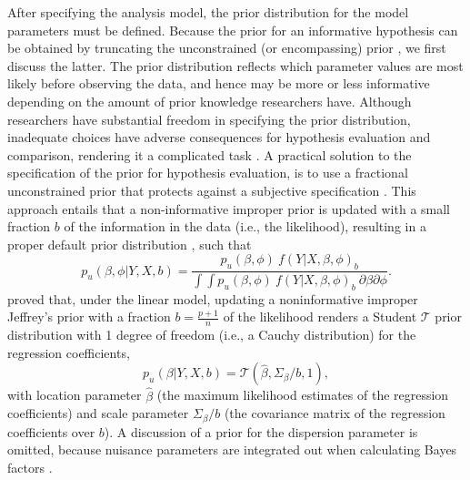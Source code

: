 \documentclass[review, 3p, authoryear]{elsarticle} %
\begin{document}
After specifying the analysis model, the prior distribution for the model parameters must be defined.
Because the prior for an informative hypothesis can be obtained by truncating the unconstrained (or encompassing) prior \citep[e.g.,][]{klugkist_inequality_2005}, we first discuss the latter.
The prior distribution reflects which parameter values are most likely before observing the data, and hence may be more or less informative depending on the amount of prior knowledge researchers have.
Although researchers have substantial freedom in specifying the prior distribution, inadequate choices have adverse consequences for hypothesis evaluation and comparison, rendering it a complicated task \citep{ohagan_fractional_1995}.
A practical solution to the specification of the prior for hypothesis evaluation, is to use a fractional unconstrained prior \citep{ohagan_fractional_1995} that protects against a subjective specification \citep{gu_approximated_2018}.
This approach entails that a non-informative improper prior is updated with a small fraction \(b\) of the information in the data (i.e., the likelihood), resulting in a proper default prior distribution \citep[e.g.,][]{mulder_equality_2010, gu_approximated_2018}, such that
\[
p_u(\beta, \phi|Y, X, b) = 
\frac{
  p_u(\beta, \phi) ~ f(Y|X, \beta, \phi)_b
}{
  \int \int p_u(\beta, \phi) ~ f(Y|X, \beta, \phi)_b ~ \partial \beta \partial \phi
}.
\]
\citet{mulder_olssoncollentine_2019} proved that, under the linear model, updating a noninformative improper Jeffrey's prior with a fraction \(b = \frac{p+1}{n}\) of the likelihood renders a Student \(\mathcal{T}\) prior distribution with 1 degree of freedom (i.e., a Cauchy distribution) for the regression coefficients,
\[
p_u(\beta | Y, X, b) = \mathcal{T}(\hat{\beta}, \Sigma_\beta / b, 1),
\]
with location parameter \(\hat{\beta}\) (the maximum likelihood estimates of the regression coefficients) and scale parameter \(\Sigma_{\beta} / b\) (the covariance matrix of the regression coefficients over \(b\)). A discussion of a prior for the dispersion parameter is omitted, because nuisance parameters are integrated out when calculating Bayes factors \citep[e.g.,][]{gu_approximated_2018}.
\end{document}
